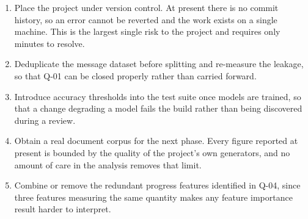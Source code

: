 \documentclass[11pt,a4paper]{article}
\begin{document}
\begin{enumerate}[leftmargin=*,itemsep=2pt]
  \item Place the project under version control. At present there is no commit history, so an error cannot be reverted and the work exists on a single machine. This is the largest single risk to the project and requires only minutes to resolve.
  \item Deduplicate the message dataset before splitting and re-measure the leakage, so that Q-01 can be closed properly rather than carried forward.
  \item Introduce accuracy thresholds into the test suite once models are trained, so that a change degrading a model fails the build rather than being discovered during a review.
  \item Obtain a real document corpus for the next phase. Every figure reported at present is bounded by the quality of the project's own generators, and no amount of care in the analysis removes that limit.
  \item Combine or remove the redundant progress features identified in Q-04, since three features measuring the same quantity makes any feature importance result harder to interpret.
\end{enumerate}
\end{document}
